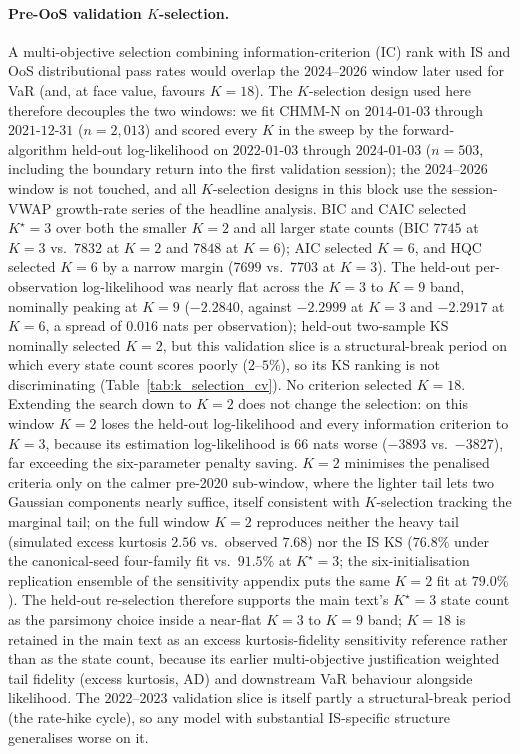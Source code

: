 \paragraph{Pre-OoS validation $K$-selection.}
A multi-objective selection combining information-criterion (IC) rank with IS and OoS distributional pass rates would overlap the $2024$--$2026$ window later used for VaR (and, at face value, favours $K = 18$). The $K$-selection design used here therefore decouples the two windows: we fit CHMM-N on $2014$-$01$-$03$ through $2021$-$12$-$31$ ($n = 2{,}013$) and scored every $K$ in the sweep by the forward-algorithm held-out log-likelihood on $2022$-$01$-$03$ through $2024$-$01$-$03$ ($n = 503$, including the boundary return into the first validation session); the $2024$--$2026$ window is not touched, and all $K$-selection designs in this block use the session-VWAP growth-rate series of the headline analysis. BIC and CAIC selected $K^\star = 3$ over both the smaller $K = 2$ and all larger state counts (BIC $7745$ at $K = 3$ vs.\ $7832$ at $K = 2$ and $7848$ at $K = 6$); AIC selected $K = 6$, and HQC selected $K = 6$ by a narrow margin ($7699$ vs.\ $7703$ at $K = 3$). The held-out per-observation log-likelihood was nearly flat across the $K = 3$ to $K = 9$ band, nominally peaking at $K = 9$ ($-2.2840$, against $-2.2999$ at $K = 3$ and $-2.2917$ at $K = 6$, a spread of $0.016$ nats per observation); held-out two-sample KS nominally selected $K = 2$, but this validation slice is a structural-break period on which every state count scores poorly ($2$--$5\%$), so its KS ranking is not discriminating (Table~\ref{tab:k_selection_cv}). No criterion selected $K = 18$. Extending the search down to $K = 2$ does not change the selection: on this window $K = 2$ loses the held-out log-likelihood and every information criterion to $K = 3$, because its estimation log-likelihood is $66$ nats worse ($-3893$ vs.\ $-3827$), far exceeding the six-parameter penalty saving. $K = 2$ minimises the penalised criteria only on the calmer pre-2020 sub-window, where the lighter tail lets two Gaussian components nearly suffice, itself consistent with $K$-selection tracking the marginal tail; on the full window $K = 2$ reproduces neither the heavy tail (simulated excess kurtosis $2.56$ vs.\ observed $7.68$) nor the IS KS ($76.8\%$ under the canonical-seed four-family fit vs.\ $91.5\%$ at $K^\star = 3$; the six-initialisation replication ensemble of the sensitivity appendix puts the same $K = 2$ fit at $79.0\%$). The held-out re-selection therefore supports the main text's $K^\star = 3$ state count as the parsimony choice inside a near-flat $K = 3$ to $K = 9$ band; $K = 18$ is retained in the main text as an excess kurtosis-fidelity sensitivity reference rather than as the state count, because its earlier multi-objective justification weighted tail fidelity (excess kurtosis, AD) and downstream VaR behaviour alongside likelihood. The $2022$--$2023$ validation slice is itself partly a structural-break period (the rate-hike cycle), so any model with substantial IS-specific structure generalises worse on it.

